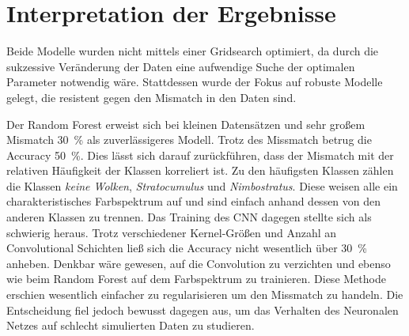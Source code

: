 \section{Interpretation der Ergebnisse}
\label{sec:04_dokumentation_interpretation_ergebnisse}

Beide Modelle wurden nicht mittels einer Gridsearch optimiert, da durch die
sukzessive Veränderung der Daten eine aufwendige Suche der optimalen Parameter
notwendig wäre.
Stattdessen wurde der Fokus auf robuste Modelle gelegt, die 
resistent gegen den Mismatch in den Daten sind.

Der Random Forest erweist sich bei kleinen Datensätzen und sehr großem
Mismatch \SI{30}{\percent} als zuverlässigeres Modell.
Trotz des Missmatch betrug die Accuracy \SI{50}{\percent}. 
Dies lässt sich darauf zurückführen, dass der Mismatch mit der relativen
Häufigkeit der Klassen korreliert ist. 
Zu den häufigsten Klassen zählen die Klassen \textit{keine Wolken}, 
\textit{Stratocumulus} und \textit{Nimbostratus}. 
Diese weisen alle ein charakteristisches Farbspektrum auf und sind einfach
anhand dessen von den anderen Klassen zu trennen.
Das Training des CNN dagegen stellte sich als schwierig heraus. 
Trotz verschiedener Kernel-Größen und Anzahl an Convolutional Schichten ließ
sich die Accuracy nicht wesentlich über \SI{30}{\percent} anheben. 
Denkbar wäre gewesen, auf die Convolution zu verzichten und ebenso wie beim
Random Forest auf dem Farbspektrum zu trainieren.
Diese Methode erschien wesentlich einfacher zu regularisieren um den Missmatch
zu handeln.
Die Entscheidung fiel jedoch bewusst dagegen aus, um das Verhalten des Neuronalen Netzes
auf schlecht simulierten Daten zu studieren. 

